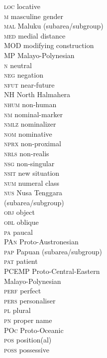 \begin{multicols}{2}
\begin{tabbing}
 \textsc{loc}  \> locative \\
 \textsc{m}  \> masculine gender \\
 \textsc{mal}  \> Maluku (subarea\slash subgroup) \\
 \textsc{med}  \> medial distance \\
 \textsc{MOD}  \> modifying construction \\
 \textsc{MP}  \> Malayo-Polynesian \\
 \textsc{n}  \> neutral \\
 \textsc{neg}  \> negation \\
 \textsc{nfut}  \> near-future \\
 \textsc{NH}  \> North Halmahera \\
 \textsc{nhum}  \> non-human \\
 \textsc{nm}  \> nominal-marker \\
 \textsc{nmlz}  \> nominalizer \\
 \textsc{nom}  \> nominative \\
 \textsc{nprx}  \> non-proximal \\
 \textsc{nrls}  \> non-realis \\
 \textsc{nsg}  \> non-singular \\
 \textsc{nsit}  \> new situation \\
 \textsc{num}  \> numeral class \\
 \textsc{nus}  \> Nusa Tenggara\\\> (subarea\slash subgroup) \\
 \textsc{obj}  \> object \\
 \textsc{obl}  \> oblique \\
 \textsc{pa}  \> paucal \\
 \textsc{PAn} \> Proto-Austronesian \\
 \textsc{pap}  \> Papuan (subarea\slash subgroup) \\
 \textsc{pat}  \> patient \\
 \textsc{PCEMP} \> Proto-Central-Eastern\\\> Malayo-Polynesian\\
 \textsc{perf}  \> perfect \\
 \textsc{pers}  \> personaliser \\
 \textsc{pl}  \> plural \\
 \textsc{pn}  \> proper name \\
 \textsc{POc} \> Proto-Oceanic \\
 \textsc{pos}  \> position(al) \\
 \textsc{poss}  \> possessive \\

\end{tabbing}
\end{multicols}
